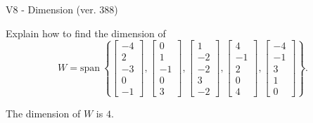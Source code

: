 \begin{exercise}
  \begin{exerciseTitle}V8 - Dimension (ver. 388)\end{exerciseTitle}
  \begin{exerciseStatement}
    Explain how to find the dimension of 
\[W=\mathrm{span}\ \left\{\left[\begin{array}{r}
-4 \\
2 \\
-3 \\
0 \\
-1
\end{array}\right] , \left[\begin{array}{r}
0 \\
1 \\
-1 \\
0 \\
3
\end{array}\right] , \left[\begin{array}{r}
1 \\
-2 \\
-2 \\
3 \\
-2
\end{array}\right] , \left[\begin{array}{r}
4 \\
-1 \\
2 \\
0 \\
4
\end{array}\right] , \left[\begin{array}{r}
-4 \\
-1 \\
3 \\
1 \\
0
\end{array}\right]\right\}.\]



  \end{exerciseStatement}
  \begin{exerciseAnswer}
   The dimension of \(W\) is  \(4\).
  


  \end{exerciseAnswer}
\end{exercise}